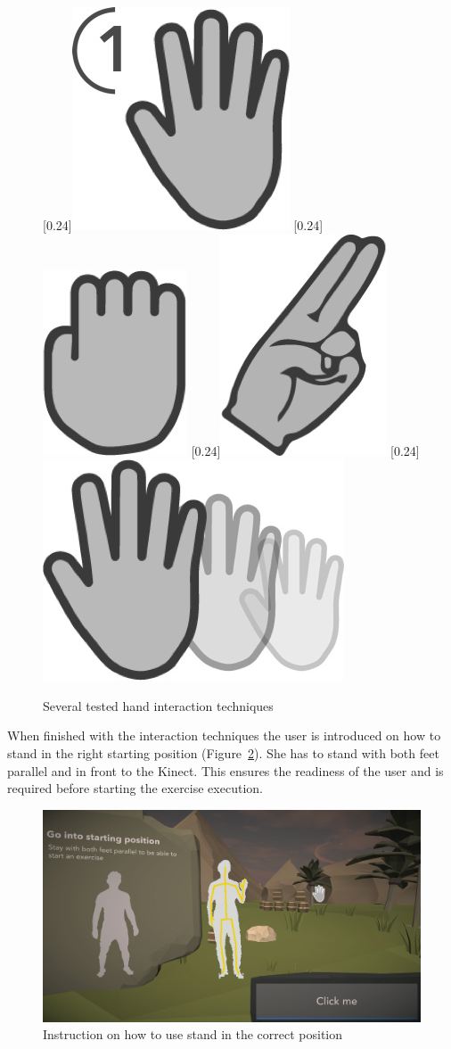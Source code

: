 \begin{figure}[htb]
	\centering
		[0.24\linewidth]{\includegraphics[width=0.14\linewidth]{Pictures/5_3_hover}}
		[0.24\linewidth]{\includegraphics[width=0.1\linewidth]{Pictures/5_3_fist}}
		[0.24\linewidth]{\includegraphics[width=0.117\linewidth]{Pictures/5_3_point}}
		[0.24\linewidth]{\includegraphics[width=0.196\linewidth]{Pictures/5_3_push2}}
	\caption{Several tested hand interaction techniques}%
	\label{fig:5_3_handInteraction}
\end{figure}

When finished with the interaction techniques the user is introduced on how to stand in the right starting position (Figure~\ref{fig:5_3_standingPosition}). She has to stand with both feet parallel and in front to the Kinect. This ensures the readiness of the user and is required before starting the exercise execution.
\begin{figure}[htb]
	\centering
	\includegraphics[width=0.5\linewidth]{Pictures/5_Workflow/4_2_StartingPosition}
	\caption{Instruction on how to use stand in the correct position}
	\label{fig:5_3_standingPosition}
\end{figure}

